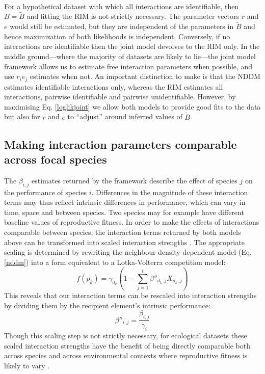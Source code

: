 \documentclass[a4,12pt]{article}
\begin{document}
\begin{refsection}
    \paragraph{}
    For a hypothetical dataset with which all interactions are identifiable, then $B = \tilde B$ and fitting the RIM is not strictly necessary. The parameter vectors $r$ and $e$ would still be estimated, but they are independent of the parameters in $\tilde B$ and hence maximization of both likelihoods is independent. Conversely, if no interactions are identifiable then the joint model devolves to the RIM only. In the middle ground---where the majority of datasets are likely to lie---the joint model framework allows us to estimate free interaction parameters when possible, and use $r_i e_j$ estimates when not. An important distinction to make is that the NDDM estimates identifiable interactions only, whereas the RIM estimates all interactions, pairwise identifiable and pairwise unidentifiable. However, by maximising Eq. \ref{loglikjoint} we allow both models to provide good fits to the data but also for $r$ and $e$ to ``adjust'' around inferred values of $\tilde B$. 


    \subsection{Making interaction parameters comparable across focal species} 

        The $\beta_{i, j}$ estimates returned by the framework describe the effect of species $j$ on the performance of species $i$. Differences in the magnitude of these interaction terms may thus reflect intrinsic differences in performance, which can vary in time, space and between species. Two species may for example have different baseline values of reproductive fitness. In order to make the effects of interactions comparable between species, the interaction terms returned by both models above can be transformed into scaled interaction strengths \parencite{Laska1998}. The appropriate scaling is determined by rewriting the neighbour density-dependent model (Eq. \ref{nddm}) into a form equivalent to a Lotka-Volterra competition model: 
        \begin{equation}
        f(p_{k}) = \gamma_{d_k} \left ( 1 - \sum_{j=1}^{t} {\beta}''_{d_k, j} X_{d_k, j} \right )
        \label{LVform}
        \end{equation}
        This reveals that our interaction terms can be rescaled into interaction strengths by dividing them by the recipient element's intrinsic performance:  
        \begin{equation}
        {\beta}''_{i, j} = \frac{\beta_{i, j}}{\gamma_{i}}
        \label{scaling}
        \end{equation}
        Though this scaling step is not strictly necessary, for ecological datasets these scaled interaction strengths have the benefit of being directly comparable both across species and across environmental contexts where reproductive fitness is likely to vary \parencite{Wootton2005}.


\end{refsection}
\end{document}
